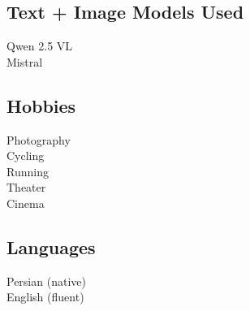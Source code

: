 \documentclass[a4paper]{deedy-resume}
\begin{document}
\begin{minipage}[t]{0.33\textwidth}
\sectionspace
\subsection*{Text + Image Models Used}
Qwen 2.5 VL \\
Mistral \\

\sectionspace
\subsection*{Hobbies}
Photography \\
Cycling \\
Running \\
Theater \\
Cinema \\

\sectionspace
\subsection*{Languages}
Persian (native) \\
English (fluent) \\

\end{minipage}
\end{document}
